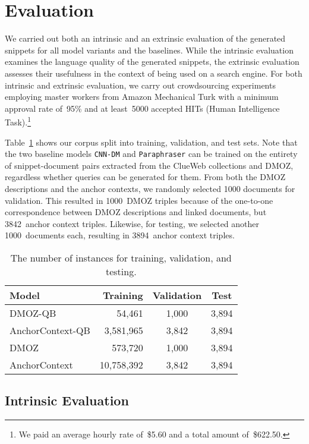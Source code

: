 \documentclass[sigconf]{acmart}
\begin{document}
 \section{Evaluation}
\label{evaluation}

We carried out both an intrinsic and an extrinsic evaluation of the generated snippets for all model variants and the baselines. While the intrinsic evaluation examines the language quality of the generated snippets, the extrinsic evaluation assesses their usefulness in the context of being used on a search engine. For both intrinsic and extrinsic evaluation, we carry out crowdsourcing experiments employing master workers from Amazon Mechanical Turk with a minimum approval rate of~95\% and at least~5000 accepted HITs (Human Intelligence Task).\footnote{We paid an average hourly rate of~\$5.60 and a total amount of~\$622.50.}  

Table~\ref{table-split} shows our corpus split into training, validation, and test sets. Note that the two baseline models {\small\tt CNN-DM} and {\small\tt Paraphraser} can be trained on the entirety of snippet-document pairs extracted from the ClueWeb collections and DMOZ, regardless whether queries can be generated for them. From both the DMOZ descriptions and the anchor contexts, we randomly selected 1000 documents for validation. This resulted in 1000~DMOZ triples because of the one-to-one correspondence between DMOZ descriptions and linked documents, but 3842~anchor context triples. Likewise, for testing, we selected another 1000~documents each, resulting in 3894~anchor context triples.

\begin{table}[tb]\centering \small \renewcommand{\tabcolsep}{4pt}\caption{The number of instances for training, validation, and testing.}\label{table-split}\begin{tabular}{@{}lrcc@{}}
\toprule
\bfseries Model & \bfseries Training & \bfseries Validation & \bfseries Test\\
\midrule
DMOZ-QB           &     54,461 & 1,000 & 3,894\\
AnchorContext-QB  &  3,581,965 & 3,842 & 3,894\\
\midrule
DMOZ              &    573,720 & 1,000 & 3,894\\
AnchorContext     & 10,758,392 & 3,842 & 3,894\\
\bottomrule
\end{tabular}\end{table} 
\subsection{Intrinsic Evaluation}
\label{intrinsic-evaluation}
\end{document}
